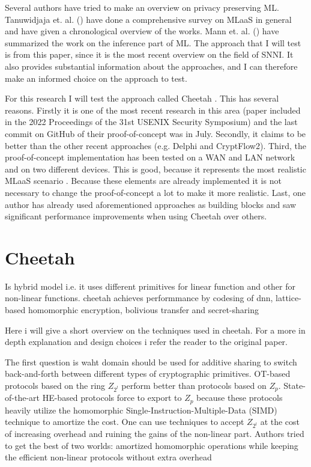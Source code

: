 \documentclass[../thesis.tex]{subfiles}
\begin{document}
Several authors have tried to make an overview on privacy preserving ML. Tanuwidjaja et. al. () have done a comprehensive survey on MLaaS in general and have given a chronological overview of the works. Mann et. al. () have summarized the work on the inference part of ML. The approach that I will test is from this paper, since it is the most recent overview on the field of SNNI. It also provides substantial information about the approaches, and I can therefore make an informed choice on the approach to test.  

For this research I will test the approach called Cheetah \parencite{Cheetah}. This has several reasons. Firstly it is one of the most recent research in this area (paper included in the 2022 Proceedings of the 31st USENIX Security Symposium) and the last commit on GitHub of their proof-of-concept was in July. Secondly, it claims to be better than the other recent approaches (e.g. Delphi and CryptFlow2). Third, the proof-of-concept implementation has been tested on a WAN and LAN network and on two different devices. This is good, because it represents the most realistic MLaaS scenario \parencite{Ribeiro2015MLaaSML}. Because these elements are already implemented it is not necessary to change the proof-of-concept a lot to make it more realistic. Last, one author \parencite{Dong2022} has already used aforementioned approaches as building blocks and saw significant performance improvements when using Cheetah over others. 


\section{Cheetah}
Is hybrid model i.e. it uses different primitives for linear function and other for non-linear functions.
cheetah achieves performmance by codesing of dnn, lattice-based homomorphic encryption, bolivious transfer and secret-sharing

Here i will give a short overview on the techniques used in cheetah. For a more in depth explanation and design choices i refer the reader to the original paper. 

The first question is waht domain should be used for additive sharing to switch back-and-forth between different types of cryptographic primitives. OT-based protocols based on the ring $Z_{2^l}$ perform better than protocols based on $Z_p$. State-of-the-art HE-based protocols force to export to $Z_p$ because these protocols heavily utilize the homomorphic Single-Instruction-Multiple-Data (SIMD) technique to amortize the cost. One can use techniques to accept $Z_{2^l}$ at the cost of increasing overhead and ruining the gains of the non-linear part.  
Authors tried to get the best of two worlds: amortized homomorphic operations while keeping the efficient non-linear protocols without extra overhead
\end{document}
